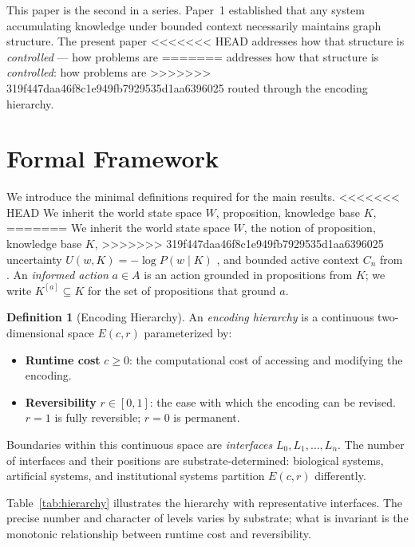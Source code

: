 \documentclass[11pt]{article}
\theoremstyle{definition}
\newtheorem{definition}{Definition}
\begin{document}
This paper is the second in a series. Paper~1 \cite{McCarthy2026a}
established that any system accumulating knowledge under bounded
context necessarily maintains graph structure. The present paper
<<<<<<< HEAD
addresses how that structure is \emph{controlled} --- how problems are
=======
addresses how that structure is \emph{controlled}: how problems are
>>>>>>> 319f447daa46f8c1e949fb7929535d1aa6396025
routed through the encoding hierarchy.

\section{Formal Framework}
\label{sec:framework}

We introduce the minimal definitions required for the main results.
<<<<<<< HEAD
We inherit the world state space $W$, proposition, knowledge base $K$,
=======
We inherit the world state space $W$, the notion of proposition, knowledge base $K$,
>>>>>>> 319f447daa46f8c1e949fb7929535d1aa6396025
uncertainty $U(w,K) = -\log P(w \mid K)$ \cite{Cover2006}, and bounded
active context $C_n$ from \cite{McCarthy2026a}. An \emph{informed
action} $a \in A$ is an action grounded in propositions from $K$; we
write $K^{[a]} \subseteq K$ for the set of propositions that ground $a$.

\begin{definition}[Encoding Hierarchy]
\label{def:hierarchy}
An \emph{encoding hierarchy} is a continuous two-dimensional space
$E(c,r)$ parameterized by:
\begin{itemize}
\item \textbf{Runtime cost} $c \geq 0$: the computational cost of
   accessing and modifying the encoding.
\item \textbf{Reversibility} $r \in [0,1]$: the ease with which the
   encoding can be revised. $r = 1$ is fully reversible; $r = 0$ is
   permanent.
\end{itemize}

Boundaries within this continuous space are \emph{interfaces}
$L_0, L_1, \ldots, L_n$. The number of interfaces and their positions
are substrate-determined: biological systems, artificial systems, and
institutional systems partition $E(c,r)$ differently.
\end{definition}

Table~\ref{tab:hierarchy} illustrates the hierarchy with representative
interfaces. The precise number and character of levels varies by
substrate; what is invariant is the monotonic relationship between
runtime cost and reversibility.
\end{document}
